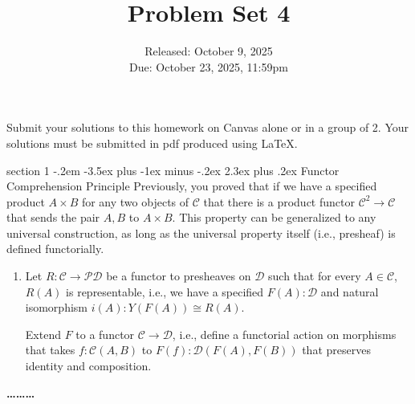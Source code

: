 \documentclass[12pt]{article}
\makeatletter
\newenvironment{problem}{\@startsection
       {section}
       {1}
       {-.2em}
       {-3.5ex plus -1ex minus -.2ex}
       {2.3ex plus .2ex}
       {\pagebreak[3]%
       \large\bf\noindent{Problem }
       }
       }
       {%
       \begin{center}\large\bf \ldots\ldots\ldots\end{center}}
\newcommand{\cat}{\mathcal}
\makeatother
\begin{document}
\title{Problem Set 4}
\date{Released: October 9, 2025\\
  Due: October 23, 2025, 11:59pm
}
\maketitle

Submit your solutions to this homework on Canvas alone or in a group of 2.
Your solutions must be submitted in pdf produced using LaTeX.

\begin{problem}{Functor Comprehension Principle}
  Previously, you proved that if we have a specified product $A \times
  B$ for any two objects of $\mathcal C$ that there is a product
  functor $\mathcal C^2 \to \mathcal C$ that sends the pair $A,B$ to
  $A \times B$. This property can be generalized to any universal
  construction, as long as the universal property itself (i.e.,
  presheaf) is defined functorially.

  \begin{enumerate}
  \item Let $R : \mathcal C \to \mathcal P\mathcal D$ be a functor to presheaves on $\cat D$
    such that for every $A \in \mathcal C$, $R(A)$ is representable,
    i.e., we have a specified $F(A) : \mathcal D$ and natural
    isomorphism $i(A) : Y(F(A)) \cong R(A)$.

    Extend $F$ to a functor $\mathcal C \to \mathcal D$, i.e., define
    a functorial action on morphisms that takes $f : \mathcal C(A,B)$
    to $F(f) : \mathcal D(F(A), F(B))$ that preserves identity and
    composition.
  \end{enumerate}
\end{problem}
\end{document}
